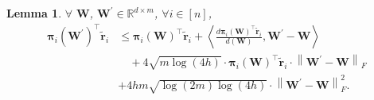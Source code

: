 \documentclass[10pt]{article}
\def\rvtilder{{\tilde{\mathbf{r}}}}
\newtheorem{lem}{Lemma}
\def\rvpi{{\boldsymbol{\pi}}}
\def\rmW{{\mathbf{W}}}
\def\sR{{\mathbb{R}}}
\begin{document}
\begin{lem}
\label{lem:semi_smoothness}
     $\forall$ $\rmW$, $\rmW^\prime \in \sR^{d \times m}$, $\forall i \in [n]$,
\begin{equation*}
\begin{split}
    \rvpi_i\left( \rmW^\prime \right)^\top \rvtilder_i &\le \rvpi_i\left( \rmW \right)^\top \rvtilder_i + \left\langle \frac{d \rvpi_i\left( \rmW \right)^\top \rvtilder_i }{d\left( \rmW \right)}, \rmW^\prime - \rmW \right\rangle \\
    &\quad + 4 \sqrt{m \log{\left(4h\right)}} \cdot \rvpi_i\left( \rmW \right)^\top \rvtilder_i \cdot \left\| \rmW^\prime - \rmW \right\|_F \\
    &+ 4 h m \sqrt{\log{\left(2m\right)} \log{\left(4h\right)}} \cdot \left\| \rmW^\prime - \rmW \right\|_F^2.
\end{split}
\end{equation*}
\end{lem}
\end{document}
